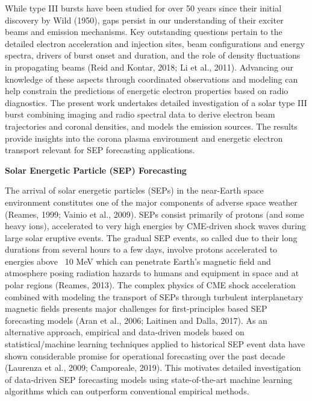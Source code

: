 While type III bursts have been studied for over 50 years since their initial discovery by Wild (1950), gaps persist in our understanding of their exciter beams and emission mechanisms. Key outstanding questions pertain to the detailed electron acceleration and injection sites, beam configurations and energy spectra, drivers of burst onset and duration, and the role of density fluctuations in propagating beams (Reid and Kontar, 2018; Li et al., 2011). Advancing our knowledge of these aspects through coordinated observations and modeling can help constrain the predictions of energetic electron properties based on radio diagnostics. The present work undertakes detailed investigation of a solar type III burst combining imaging and radio spectral data to derive electron beam trajectories and coronal densities, and models the emission sources. The results provide insights into the corona plasma environment and energetic electron transport relevant for SEP forecasting applications.

\textbf{Solar Energetic Particle (SEP) Forecasting}

The arrival of solar energetic particles (SEPs) in the near-Earth space environment constitutes one of the major components of adverse space weather (Reames, 1999; Vainio et al., 2009). SEPs consist primarily of protons (and some heavy ions), accelerated to very high energies by CME-driven shock waves during large solar eruptive events. The gradual SEP events, so called due to their long durations from several hours to a few days, involve protons accelerated to energies above ~10 MeV which can penetrate Earth’s magnetic field and atmosphere posing radiation hazards to humans and equipment in space and at polar regions (Reames, 2013). The complex physics of CME shock acceleration combined with modeling the transport of SEPs through turbulent interplanetary magnetic fields presents major challenges for first-principles based SEP forecasting models (Aran et al., 2006; Laitinen and Dalla, 2017). As an alternative approach, empirical and data-driven models based on statistical/machine learning techniques applied to historical SEP event data have shown considerable promise for operational forecasting over the past decade (Laurenza et al., 2009; Camporeale, 2019). This motivates detailed investigation of data-driven SEP forecasting models using state-of-the-art machine learning algorithms which can outperform conventional empirical methods.

